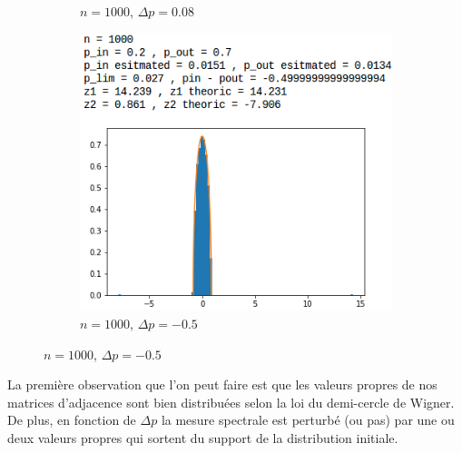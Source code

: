\begin{figure}[H]
\begin{subfigure}{.5\textwidth}
		\caption{$n=1000$, $\Delta p=0.08$}
		\label{n1000delta008}
	\end{subfigure}
	\begin{subfigure}{.5\textwidth}
		\centering
		\includegraphics[scale=0.58]{static/spectral_n1000_pin02_pout07.png}
		\caption{$n=1000$, $\Delta p=-0.5$}
		\label{n1000delta-05}
	\end{subfigure}
\end{figure}

La première observation que l'on peut faire est que les valeurs propres de nos matrices d'adjacence sont bien distribuées selon la loi du demi-cercle de Wigner.
De plus, en fonction de $\Delta p$ la mesure spectrale est perturbé (ou pas) par une ou deux valeurs propres qui sortent du support de la distribution initiale.\\


